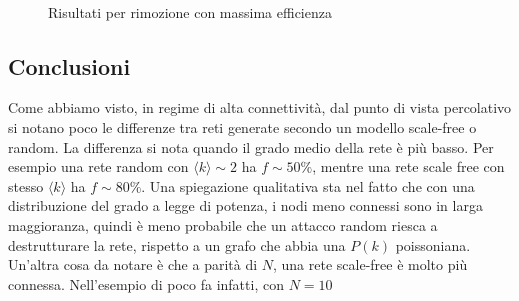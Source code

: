 \begin{figure}[p!]
	$\;$
	\caption[Risultati attacco.]{Risultati per rimozione con massima efficienza}
	\label{fig:atak}
\end{figure}

\subsection{Conclusioni}
Come abbiamo visto, in regime di alta connettività, dal punto di vista percolativo si notano poco le differenze tra reti generate secondo un modello scale-free o random. La differenza si nota quando il grado medio della rete è più basso. Per esempio una rete random con $\langle k \rangle \sim 2$ ha $f\sim 50\%$, mentre una rete scale free con stesso $\langle k \rangle$ ha $f\sim 80\%$. Una spiegazione qualitativa sta nel fatto che con una distribuzione del grado a legge di potenza, i nodi meno connessi sono in larga maggioranza, quindi è meno probabile che un attacco random riesca a destrutturare la rete, rispetto a un grafo che abbia una $P(k)$ poissoniana. Un'altra cosa da notare è che a parità di $N$, una rete scale-free è molto più connessa. Nell'esempio di poco fa infatti, con $N=10$

